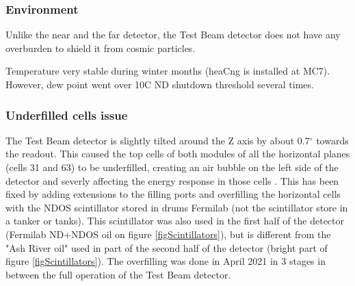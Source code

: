 \documentclass[12pt,a4paper]{article}
\begin{document}
\subsubsection*{Environment}
Unlike the near and the far detector, the Test Beam detector does not have any overburden to shield it from cosmic particles. 


Temperature very stable during winter months (heaCng is installed at MC7). However, dew point went over 10C ND shutdown threshold several times.



\subsubsection*{Underfilled cells issue}
The Test Beam detector is slightly tilted around the Z axis by about 0.7$^{\circ}$ towards the readout. This caused the top cells of both modules of all the horizontal planes (cells 31 and 63) to be underfilled, creating an air bubble on the left side of the detector and severly affecting the energy response in those cells \cite{TeresaThesis}. This has been fixed \cite{NOVA-doc-49439} by adding extensions to the filling ports and overfilling the horizontal cells with the NDOS scintillator stored in drums Fermilab (not the scintillator store in a tanker or tanks). This scintillator was also used in the first half of the detector (Fermilab ND+NDOS oil on figure \ref{figScintillators}), but is different from the "Ash River oil" used in part of the second half of the detector (bright part of figure \ref{figScintillators}). The overfilling was done in April 2021 in 3 stages in between the full operation of the Test Beam detector.

\end{document}
